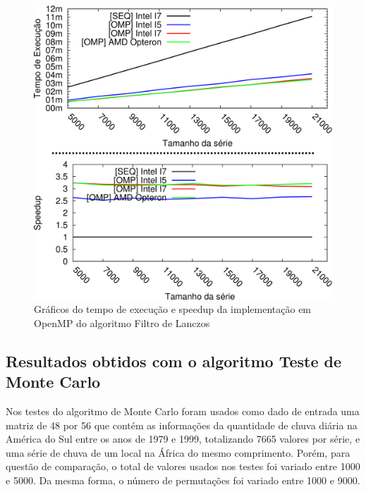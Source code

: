 \begin{figure}[H]
\centering
\includegraphics[]{Imagens/graficos_lanczos/lanczos_omp.png}
\caption{Gráficos do tempo de execução e speedup da implementação em OpenMP do algoritmo Filtro de Lanczos}
\label{fig:graficos_lanczos_omp}
\end{figure}

\subsection{Resultados obtidos com o algoritmo Teste de Monte Carlo}

Nos testes do algoritmo de Monte Carlo foram usados como dado de entrada uma matriz de 48 por 56 que contém as informações da quantidade de chuva diária na América do Sul entre os anos de 1979 e 1999, totalizando 7665 valores por série, e uma série de chuva de um local na África do mesmo comprimento.
Porém, para questão de comparação, o total de valores usados nos testes foi variado entre 1000 e 5000. Da mesma forma, o número de permutações foi variado entre 1000 e 9000.

